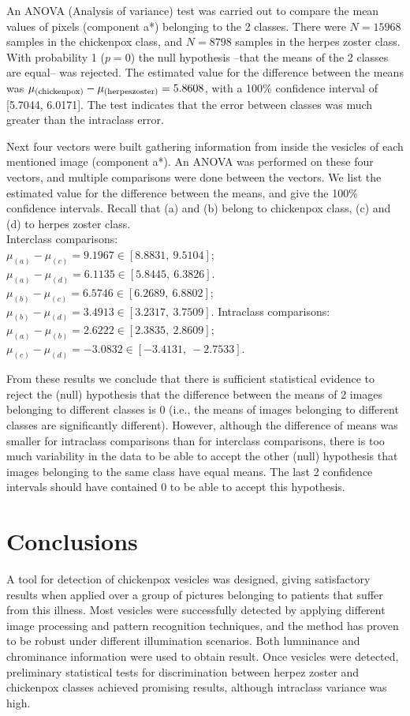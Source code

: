 \documentclass[oribibl]{llncs}
\begin{document}
An ANOVA (Analysis of variance) test was carried out to compare the mean values of pixels (component a*) belonging to the 2 classes.  There were $N=15968$ samples in the chickenpox class, and $N=8798$ samples in the herpes zoster class. 
With probability 1 ($p=0$) the null hypothesis --that the means of the 2 classes are equal-- was rejected. The estimated value for the difference between the means was $\mu_{\scriptsize\textrm{(chickenpox)}}- \mu_{\scriptsize\textrm{(herpeszoster)}} =5.8608$, with a 100\% confidence interval of  [5.7044,  6.0171]. The test 
indicates that the error between classes was much greater than the intraclass error.   

Next four vectors were built gathering information from inside the vesicles of each mentioned image (component a*). An ANOVA was performed on these four vectors, and multiple comparisons were done between the vectors. 
We list the estimated value for the difference between the means, and give the  100\% confidence intervals. Recall that (a) and (b) belong to chickenpox class, (c) and (d) to herpes zoster class.\\
Interclass comparisons:\\
$\mu_{(a)}- \mu_{(c)} =  9.1967      \in [   8.8831    , \      9.5104    ]$;  
$\mu_{(a)}- \mu_{(d)} =   6.1135      \in [  5.8445     , \      6.3826    ]$.  
$\mu_{(b)}- \mu_{(c)} =  6.5746      \in  [   6.2689    , \      6.8802     ]$;  
$\mu_{(b)}- \mu_{(d)} =   3.4913       \in [ 3.2317      , \     3.7509    ]$.  
Intraclass comparisons:\\
$\mu_{(a)}- \mu_{(b)} =  2.6222       \in [   2.3835 , \       2.8609    ]$;  
$\mu_{(c)}- \mu_{(d)} =   -3.0832         \in [ -3.4131, \     -2.7533 ]$.  
 

From these results we conclude that there is sufficient statistical evidence to
reject the (null) hypothesis that the difference between the means of 2 images
belonging to different classes is 0 (i.e., the means of images belonging to
different classes are significantly different).
However, although the difference of means was smaller for intraclass comparisons than for interclass comparisons, there is too much variability in the data to be able 
to accept the other (null) hypothesis that images belonging to the same class have equal means. The last 2 confidence intervals should have contained 0 to be able to accept this hypothesis.

\section{Conclusions}
A tool for detection of chickenpox vesicles was designed, giving satisfactory results when applied over a group of pictures belonging to patients that suffer from this illness. 
Most vesicles were successfully detected by applying different image processing and pattern recognition techniques, and the method has proven to be robust under different illumination scenarios. 
Both lumninance and chrominance information were used to obtain result. Once vesicles were detected, preliminary statistical tests for discrimination between herpez zoster and chickenpox classes achieved promising results, although intraclass variance was high.
\end{document}
